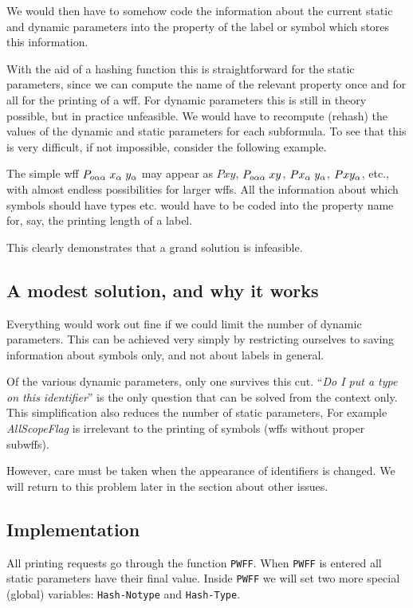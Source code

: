 We would then have to somehow code the information about the current
static and dynamic parameters into the property of the label or symbol
which stores this information.

With the aid of a hashing function this is straightforward for the
static parameters, since we can compute the name of the relevant property
once and for all for the printing of a wff.  For dynamic parameters
this is still in theory possible, but in practice unfeasible.  We would
have to recompute (rehash) the values of the dynamic and static parameters
for each subformula.  To see that this is very difficult, if not impossible,
consider the following example.

The simple wff $P_{o\alpha\alpha} \; x_\alpha \; y_\alpha$
may
appear as $Pxy$, $P_{o\alpha\alpha}\; x y$,
$Px_\alpha\;y_\alpha$,
$Pxy_\alpha$, etc., with almost endless
possibilities for larger wffs.  All the information about which symbols should
have types etc. would have to be coded into the property name for, say, the
printing length of a label.

This clearly demonstrates that a grand solution is infeasible.

\subsection{A modest solution, and why it works}
Everything would work out fine if we could limit the number of dynamic
parameters.  This can be achieved very simply by restricting ourselves
to saving information about symbols only, and not about labels in general.

Of the various dynamic parameters, only one survives this cut. ``{\it Do I
put a type on this identifier}'' is the only question that can be solved
from the context only.  This simplification also reduces the number of
static parameters, For example {\it AllScopeFlag} is irrelevant to the printing
of symbols (wffs without proper subwffs).

However, care must be taken when the appearance of identifiers is changed. 
We will return to this problem later in the section about other issues.

\subsection{Implementation}
All printing requests go through the function {\tt PWFF}.  When {\tt PWFF} is
entered all static parameters have their final value.  Inside {\tt PWFF}
we will set two more special (global) variables: {\tt Hash-Notype} and
{\tt Hash-Type}.

